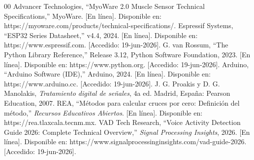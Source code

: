 \documentclass[conference]{IEEEtran}
\begin{document}
\begin{thebibliography}{00}
 Advancer Technologies, ``MyoWare 2.0 Muscle Sensor Technical Specifications,'' MyoWare. [En l\'inea]. Disponible en: https://myoware.com/products/technical-specifications/.
 Espressif Systems, ``ESP32 Series Datasheet,'' v4.4, 2024. [En l\'inea]. Disponible en: https://www.espressif.com. [Accedido: 19-jun-2026].
 G. van Rossum, ``The Python Library Reference,'' Release 3.12, Python Software Foundation, 2023. [En l\'inea]. Disponible en: https://www.python.org. [Accedido: 19-jun-2026].
 Arduino, ``Arduino Software (IDE),'' Arduino, 2024. [En l\'inea]. Disponible en: https://www.arduino.cc. [Accedido: 19-jun-2026].
 J. G. Proakis y D. G. Manolakis, \textit{Tratamiento digital de se\~nales}, 4a ed. Madrid, Espa\~na: Pearson Education, 2007.
 REA, ``M\'etodos para calcular cruces por cero: Definici\'on del m\'etodo,'' \textit{Recursos Educativos Abiertos}. [En l\'inea]. Disponible en: https://rea.tlaxcala.tecnm.mx. 
 VAD Tech Research, ``Voice Activity Detection Guide 2026: Complete Technical Overview,'' \textit{Signal Processing Insights}, 2026. [En l\'inea]. Disponible en: https://www.signalprocessinginsights.com/vad-guide-2026. [Accedido: 19-jun-2026].
\end{thebibliography}
\end{document}
